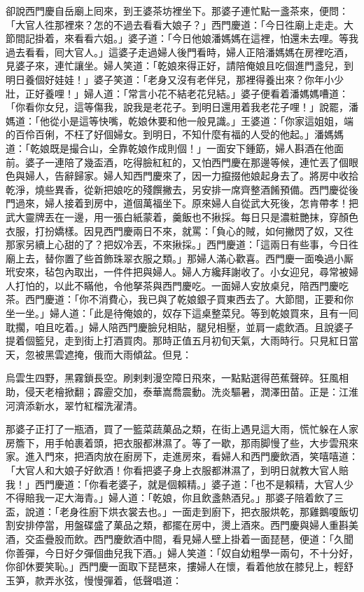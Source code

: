 卻說西門慶自岳廟上囘來，到王婆茶坊裡坐下。那婆子連忙點一盞茶來，便問：「大官人徃那裡來？怎的不過去看看大娘子？」西門慶道：「今日徃廟上走走。大節間記掛着，來看看六姐。」婆子道：「今日他娘潘媽媽在這裡，怕還未去哩。等我過去看看，囘大官人。」這婆子走過婦人後門看時，婦人正陪潘媽媽在房裡吃酒，見婆子來，連忙讓坐。婦人笑道：「乾娘來得正好，請陪俺娘且吃個進門盞兒，到明日養個好娃娃！」婆子笑道：「老身又沒有老伴兒，那裡得養出來？你年小少壯，正好養哩！」婦人道：「常言小花不結老花兒結。」婆子便看着潘媽媽嘈道：「你看你女兒，這等傷我，說我是老花子。到明日還用着我老花子哩！」{}說罷，潘媽道：「他從小是這等快嘴，乾娘休要和他一般見識。」王婆道：「你家這姐姐，端的百伶百俐，不枉了好個婦女。到明日，不知什麼有福的人受的他起。」潘媽媽道：「乾娘既是撮合山，全靠乾娘作成則個！」一面安下鍾筯，婦人斟酒在他面前。婆子一連陪了幾盃酒，吃得臉紅紅的，又怕西門慶在那邊等候，連忙丟了個眼色與婦人，告辭歸家。婦人知西門慶來了，因一力攛掇他娘起身去了。將房中收拾乾淨，燒些異香，從新把娘吃的殘饌撇去，另安排一席齊整酒餚預備。西門慶從後門過來，婦人接着到房中，道個萬福坐下。原來婦人自從武大死後，怎肯帶孝！把武大靈牌丟在一邊，{}用一張白紙蒙着，羹飯也不揪採。每日只是濃粧艷抹，穿顏色衣服，打扮嬌樣。因見西門慶兩日不來，就罵：「負心的賊，如何撇閃了奴，又徃那家另續上心甜的了？把奴冷丟，不來揪採。」西門慶道：「這兩日有些事，今日徃廟上去，替你置了些首飾珠翠衣服之類。」那婦人滿心歡喜。西門慶一面喚過小厮玳安來，毡包內取出，一件件把與婦人。婦人方纔拜謝收了。小女迎兒，尋常被婦人打怕的，以此不瞞他，令他拏茶與西門慶吃。一面婦人安放桌兒，陪西門慶吃茶。西門慶道：「你不消費心，我已與了乾娘銀子買東西去了。大節間，正要和你坐一坐。」婦人道：「此是待俺娘的，奴存下這桌整菜兒。等到乾娘買來，且有一囘耽擱，咱且吃着。」婦人陪西門慶臉兒相貼，腿兒相壓，並肩一處飲酒。且說婆子提着個籃兒，走到街上打酒買肉。那時正值五月初旬天氣，大雨時行。只見紅日當天，忽被黑雲遮掩，俄而大雨傾盆。但見：

\begin{myquote} 
烏雲生四野，黑霧鎖長空。刷剌剌漫空障日飛來，一點點選得芭蕉聲碎。狂風相助，侵天老檜掀翻；霹靂交加，泰華嵩喬震動。洗炎驅暑，潤澤田苗。正是：江淮河濟添新水，翠竹紅榴洗濯清。
\end{myquote} 

那婆子正打了一瓶酒，買了一籃菜蔬菓品之類，在街上遇見這大雨，慌忙躲在人家房簷下，用手帕裹着頭，把衣服都淋濕了。等了一歇，那雨脚慢了些，大步雲飛來家。進入門來，把酒肉放在廚房下，走進房來，看婦人和西門慶飲酒，笑嘻嘻道：「大官人和大娘子好飲酒！你看把婆子身上衣服都淋濕了，到明日就教大官人賠我！」西門慶道：「你看老婆子，就是個賴精。」婆子道：「也不是賴精，大官人少不得賠我一疋大海青。」婦人道：「乾娘，你且飲盞熱酒兒。」那婆子陪着飲了三盃，說道：「老身徃廚下烘衣裳去也。」一面走到廚下，把衣服烘乾，那雞鵝嗄飯切割安排停當，用盤碟盛了菓品之類，都擺在房中，燙上酒來。西門慶與婦人重斟美酒，交盃疊股而飲。西門慶飲酒中間，看見婦人壁上掛着一面琵琶，便道：「久聞你善彈，今日好夕彈個曲兒我下酒。」婦人笑道：「奴自幼粗學一兩句，不十分好，你卻休要笑恥。」西門慶一面取下琵琶來，摟婦人在懷，看着他放在膝兒上，輕舒玉笋，款弄氷弦，慢慢彈着，低聲唱道：

